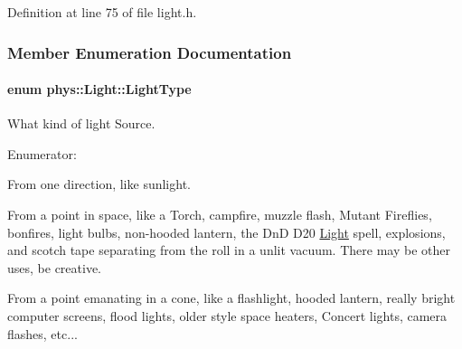 Definition at line 75 of file light.h.



\subsubsection{Member Enumeration Documentation}
\hypertarget{classphys_1_1Light_aef1be63d57f59f33bf4c66be797009bf}{
\paragraph[{LightType}]{\setlength{\rightskip}{0pt plus 5cm}enum {\bf phys::Light::LightType}}\hfill}
\label{dc/df1/classphys_1_1Light_aef1be63d57f59f33bf4c66be797009bf}


What kind of light Source. 

\begin{Desc}
\item[Enumerator: ]\par
\begin{description}
\item[{\em 
\hypertarget{classphys_1_1Light_aef1be63d57f59f33bf4c66be797009bfac3ba7607dde18593ca9c727b0baf81e3}{
Directional}
\label{dc/df1/classphys_1_1Light_aef1be63d57f59f33bf4c66be797009bfac3ba7607dde18593ca9c727b0baf81e3}
}]From one direction, like sunlight. \item[{\em 
\hypertarget{classphys_1_1Light_aef1be63d57f59f33bf4c66be797009bfa8030594658d86b56e82ac4e4233eeb63}{
Point}
\label{dc/df1/classphys_1_1Light_aef1be63d57f59f33bf4c66be797009bfa8030594658d86b56e82ac4e4233eeb63}
}]From a point in space, like a Torch, campfire, muzzle flash, Mutant Fireflies, bonfires, light bulbs, non-\/hooded lantern, the DnD D20 \hyperlink{classphys_1_1Light}{Light} spell, explosions, and scotch tape separating from the roll in a unlit vacuum. There may be other uses, be creative. \item[{\em 
\hypertarget{classphys_1_1Light_aef1be63d57f59f33bf4c66be797009bfa8b7e7aa3e44d03789a35c40947e99f3a}{
Spotlight}
\label{dc/df1/classphys_1_1Light_aef1be63d57f59f33bf4c66be797009bfa8b7e7aa3e44d03789a35c40947e99f3a}
}]From a point emanating in a cone, like a flashlight, hooded lantern, really bright computer screens, flood lights, older style space heaters, Concert lights, camera flashes, etc... \end{description}
\end{Desc}



